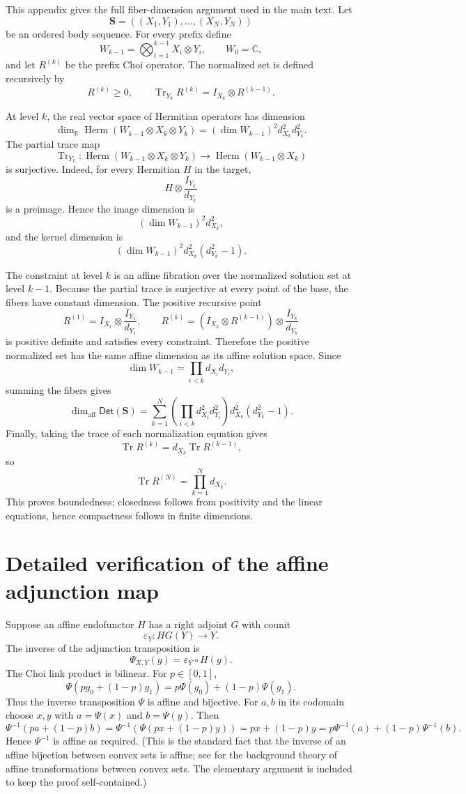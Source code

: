 \documentclass[11pt,a4paper]{article}
\theoremstyle{definition}
\theoremstyle{plain}
\theoremstyle{remark}
\DeclareMathOperator{\Tr}{Tr}
\DeclareMathOperator{\Herm}{Herm}
\newcommand{\Det}{\mathsf{Det}}
\newcommand{\affdim}{\dim_{\mathrm{aff}}}
\begin{document}
This appendix gives the full fiber-dimension argument used in the main
text. Let
\[
\mathbf S=((X_1,Y_1),\ldots,(X_N,Y_N))
\]
be an ordered body sequence. For every prefix define
\[
W_{k-1}=\bigotimes_{i=1}^{k-1}X_i\otimes Y_i,
\qquad W_0=\mathbb C,
\]
and let $R^{(k)}$ be the prefix Choi operator. The normalized set is
defined recursively by
\[
R^{(k)}\geq0,
\qquad
\Tr_{Y_k}R^{(k)}=I_{X_k}\otimes R^{(k-1)}.
\]

At level $k$, the real vector space of Hermitian operators has dimension
\[
\dim_{\mathbb R}\Herm(W_{k-1}\otimes X_k\otimes Y_k)
=(\dim W_{k-1})^2d_{X_k}^2d_{Y_k}^2.
\]
The partial trace map
\[
\Tr_{Y_k}:\Herm(W_{k-1}\otimes X_k\otimes Y_k)
\to\Herm(W_{k-1}\otimes X_k)
\]
is surjective. Indeed, for every Hermitian $H$ in the target,
\[
H\otimes\frac{I_{Y_k}}{d_{Y_k}}
\]
is a preimage. Hence the image dimension is
\[
(\dim W_{k-1})^2d_{X_k}^2,
\]
and the kernel dimension is
\[
(\dim W_{k-1})^2d_{X_k}^2(d_{Y_k}^2-1).
\]

The constraint at level $k$ is an affine fibration over the normalized
solution set at level $k-1$. Because the partial trace is surjective at
every point of the base, the fibers have constant dimension. The
positive recursive point
\[
R^{(1)}=I_{X_1}\otimes\frac{I_{Y_1}}{d_{Y_1}},
\qquad
R^{(k)}=\left(I_{X_k}\otimes R^{(k-1)}\right)
\otimes\frac{I_{Y_k}}{d_{Y_k}}
\]
is positive definite and satisfies every constraint. Therefore the
positive normalized set has the same affine dimension as its affine
solution space. Since
\[
\dim W_{k-1}=
\prod_{i<k}d_{X_i}d_{Y_i},
\]
summing the fibers gives
\[
\affdim\Det(\mathbf S)=
\sum_{k=1}^N
\left(\prod_{i<k}d_{X_i}^2d_{Y_i}^2\right)
 d_{X_k}^2(d_{Y_k}^2-1).
\]
Finally, taking the trace of each normalization equation gives
\[
\Tr R^{(k)}=d_{X_k}\Tr R^{(k-1)},
\]
so
\[
\Tr R^{(N)}=\prod_{k=1}^Nd_{X_k}.
\]
This proves boundedness; closedness follows from positivity and the
linear equations, hence compactness follows in finite dimensions.

\section{Detailed verification of the affine adjunction map}
\label{app:affinity}

Suppose an affine endofunctor $H$ has a right adjoint $G$ with counit
\[
\varepsilon_Y:HG(Y)\to Y.
\]
The inverse of the adjunction transposition is
\[
\Psi_{X,Y}(g)
=\varepsilon_Y\circ H(g).
\]
The Choi link product is bilinear. For $p\in[0,1]$,
\[
\Psi(p g_0+(1-p)g_1)
=p\Psi(g_0)+(1-p)\Psi(g_1).
\]
Thus the inverse transposition $\Psi$ is affine and bijective. For
$a,b$ in its codomain choose $x,y$ with $a=\Psi(x)$ and $b=\Psi(y)$.
Then
\[
\Psi^{-1}(pa+(1-p)b)
=\Psi^{-1}(\Psi(px+(1-p)y))
=px+(1-p)y
=p\Psi^{-1}(a)+(1-p)\Psi^{-1}(b).
\]
Hence $\Psi^{-1}$ is affine as required. (This is the standard fact that the inverse of an affine bijection between convex sets is affine; see \cite{rockafellar1970} for the background theory of affine transformations between convex sets. The elementary argument is included to keep the proof self-contained.)
\end{document}
